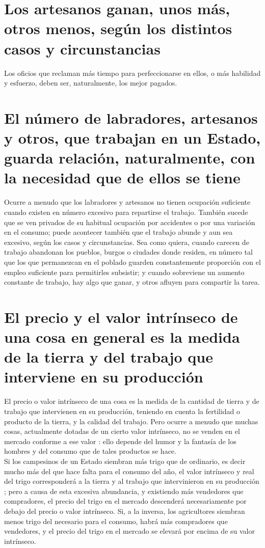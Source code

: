 \documentclass[10pt]{article}
\begin{document}
\begin{multicols}{1}
\section*{Los artesanos ganan, unos más, otros menos, según los distintos casos y circunstancias}
Los oficios que reclaman más tiempo para perfeccionarse en ellos, o más habilidad y esfuerzo, deben ser, naturalmente, los mejor pagados.
\section*{El número de labradores, artesanos y otros, que trabajan en un Estado, guarda relación, naturalmente, con la necesidad que de ellos se tiene}
Ocurre a menudo que los labradores y artesanos no tienen ocupación suficiente cuando existen en número excesivo para repartirse el trabajo. También sucede que se ven privados de su habitual ocupación por accidentes o por una variación en el consumo; puede acontecer también que el trabajo abunde y aun sea excesivo, según los casos y circunstancias. Sea como quiera, cuando carecen de trabajo abandonan los pueblos, burgos o ciudades donde residen, en número tal que los que permanezcan en el poblado guarden constantemente proporción con el empleo suficiente para permitirles subsistir; y cuando sobreviene un aumento constante de trabajo, hay algo que ganar, y otros afluyen para compartir la tarea.
\section*{El precio y el valor intrínseco de una cosa en general es la medida de la tierra y del trabajo que interviene en su producción}
El precio o valor intrínseco de una cosa es la medida de la cantidad de tierra y de trabajo que intervienen en su producción, teniendo en cuenta la fertilidad o producto de la tierra, y la calidad del trabajo. Pero ocurre a menudo que muchas cosas, actualmente dotadas de un cierto valor intrínseco, no se venden en el mercado conforme a ese valor : ello depende del humor y la fantasía de los hombres y del consumo que de tales productos se hace.\\
Si los campesinos de un Estado siembran más trigo que de ordinario, es decir mucho más del que hace falta para el consumo del año, el valor intrínseco y real del trigo corresponderá a la tierra y al trabajo que intervinieron en su producción ; pero a causa de esta excesiva abundancia, y existiendo más vendedores que compradores, el precio del trigo en el mercado descenderá necesariamente por debajo del precio o valor intrínseco. Si, a la inversa, los agricultores siembran menos trigo del necesario para el consumo, habrá más compradores que vendedores, y el precio del trigo en el mercado se elevará por encima de su valor intrínseco.

\end{multicols}
\end{document}
